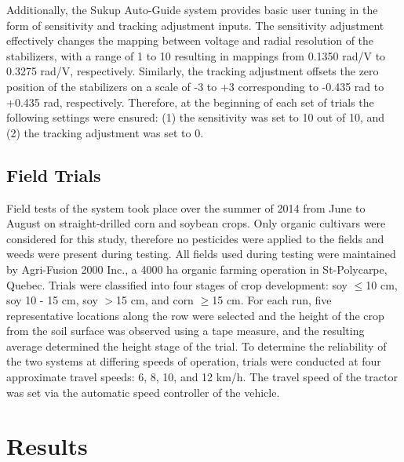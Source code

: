 \documentclass[authoryear]{elsarticle}
\begin{document}
Additionally, the Sukup Auto-Guide system provides basic user tuning
in the form of sensitivity and tracking adjustment inputs. The
sensitivity adjustment effectively changes the mapping between voltage
and radial resolution of the stabilizers, with a range of 1 to 10
resulting in mappings from 0.1350 rad/V to 0.3275 rad/V,
respectively. Similarly, the tracking adjustment offsets the zero
position of the stabilizers on a scale of -3 to +3 corresponding to
-0.435 rad to +0.435 rad, respectively. Therefore, at the beginning of
each set of trials the following settings were ensured: (1) the
sensitivity was set to 10 out of 10, and (2) the tracking adjustment
was set to 0.

\subsection{Field Trials}
Field tests of the system took place over the summer of 2014 from June
to August on straight-drilled corn and soybean crops. Only organic
cultivars were considered for this study, therefore no pesticides were
applied to the fields and weeds were present during testing. All
fields used during testing were maintained by Agri-Fusion 2000 Inc., a
4000 ha organic farming operation in St-Polycarpe, Quebec. Trials were
classified into four stages of crop development: soy $\le$10 cm, soy 10 - 15
cm, soy $>$15 cm, and corn $\ge$15 cm. For each run, five representative
locations along the row were selected and the height of the crop from
the soil surface was observed using a tape measure, and the resulting
average determined the height stage of the trial. To determine the
reliability of the two systems at differing speeds of operation,
trials were conducted at four approximate travel speeds: 6, 8, 10, and
12 km/h. The travel speed of the tractor was set via the automatic
speed controller of the vehicle.

\section{Results}
\end{document}
